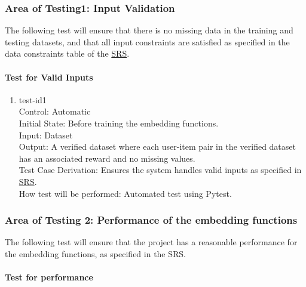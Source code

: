 \documentclass[12pt, titlepage]{article}
\begin{document}
\subsubsection{Area of Testing1: Input Validation}

The following test will ensure that there is no missing data in the training and testing datasets, and that all input constraints are satisfied as specified in the data constraints table of the \href{https://github.com/V-AS/Two-tower-recommender-system/blob/main/docs/SRS/SRS.pdf}{SRS}.
		
\paragraph{Test for Valid Inputs}

\begin{enumerate}

  \item{test-id1\\}
  Control: Automatic\\
  Initial State: Before training the embedding functions.\\
  Input: Dataset\\
  Output: A verified dataset where each user-item pair in the verified dataset has an associated reward and no missing values.\\
  Test Case Derivation: Ensures the system handles valid inputs as specified in \href{https://github.com/V-AS/Two-tower-recommender-system/blob/main/docs/SRS/SRS.pdf}{SRS}. \\
  How test will be performed: Automated test using Pytest.
					
\end{enumerate}

\subsubsection{Area of Testing 2: Performance of the embedding functions}

The following test will ensure that the project has a reasonable performance for the embedding functions, as specified in the SRS.

\paragraph{Test for performance}
\end{document}
